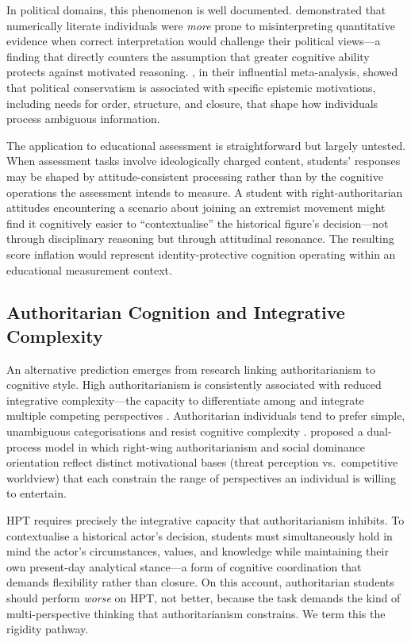 \documentclass[referee,pdflatex,sn-apa]{sn-jnl}
\begin{document}
In political domains, this phenomenon is well documented. \citet{Kahan2017} demonstrated that numerically literate individuals were \textit{more} prone to misinterpreting quantitative evidence when correct interpretation would challenge their political views---a finding that directly counters the assumption that greater cognitive ability protects against motivated reasoning. \citet{Jost2003}, in their influential meta-analysis, showed that political conservatism is associated with specific epistemic motivations, including needs for order, structure, and closure, that shape how individuals process ambiguous information.

The application to educational assessment is straightforward but largely untested. When assessment tasks involve ideologically charged content, students' responses may be shaped by attitude-consistent processing rather than by the cognitive operations the assessment intends to measure. A student with right-authoritarian attitudes encountering a scenario about joining an extremist movement might find it cognitively easier to ``contextualise'' the historical figure's decision---not through disciplinary reasoning but through attitudinal resonance. The resulting score inflation would represent identity-protective cognition operating within an educational measurement context.

\subsection{Authoritarian Cognition and Integrative Complexity}\label{subsec:authcog}

An alternative prediction emerges from research linking authoritarianism to cognitive style. High authoritarianism is consistently associated with reduced integrative complexity---the capacity to differentiate among and integrate multiple competing perspectives \citep{Suedfeld1977,Duckitt2001}. Authoritarian individuals tend to prefer simple, unambiguous categorisations and resist cognitive complexity \citep{VanHiel2016}. \citet{Duckitt2001} proposed a dual-process model in which right-wing authoritarianism and social dominance orientation reflect distinct motivational bases (threat perception vs.\ competitive worldview) that each constrain the range of perspectives an individual is willing to entertain.

HPT requires precisely the integrative capacity that authoritarianism inhibits. To contextualise a historical actor's decision, students must simultaneously hold in mind the actor's circumstances, values, and knowledge while maintaining their own present-day analytical stance---a form of cognitive coordination that demands flexibility rather than closure. On this account, authoritarian students should perform \textit{worse} on HPT, not better, because the task demands the kind of multi-perspective thinking that authoritarianism constrains. We term this the rigidity pathway.
\end{document}
